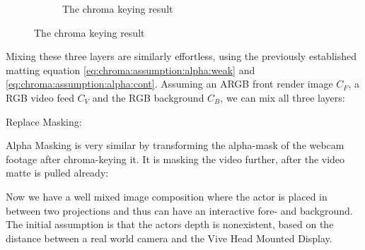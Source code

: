 \begin{figure}[htbp]
\begin{subfigure}[t]{.45\textwidth}
		\caption{The chroma keying result}
	\end{subfigure}
\end{figure}

Mixing these three layers are similarly effortless, using the previously 
established matting equation \eqref{eq:chroma:assumption:alpha:weak} and 
\eqref{eq:chroma:assumption:alpha:cont}. Assuming an ARGB front render image 
$C_F$, a RGB video feed  $C_V$ and the RGB background $C_B$, 
we can mix all three layers:

Replace Masking:







Alpha Masking is very similar by transforming the alpha-mask of the webcam 
footage after chroma-keying it. It is masking the video further, after the 
video matte is pulled already:






Now we have a well mixed image composition where the actor is placed in between 
two projections and thus can have an interactive fore- and background. The 
initial assumption is that the actors depth is nonexistent, based on the 
distance between a real world camera and the Vive Head Mounted Display.